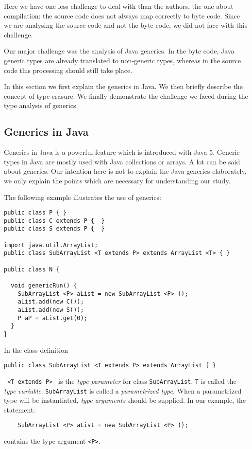 \documentclass{uvamscse}
\begin{document}
Here we have one less challenge to deal with than the authors, the one about compilation: the source code does not always map correctly to byte code. Since we are analysing the source code and not the byte code, we did not face with this challenge. 

Our major challenge was the analysis of Java generics. In the byte code, Java generic types are already translated to non-generic types, whereas in the source code this processing should still take place. 

In this section we first explain the generics in Java. We then briefly describe the concept of type erasure. We finally demonstrate the challenge we faced during the type analysis of generics.

\subsection{Generics in Java} \label{JavaGenerics}
Generics in Java is a powerful feature which is introduced with Java 5. Generic types in Java are mostly used with Java collections or arrays. A lot can be said about generics. Our intention here is not to explain the Java generics elaborately, we only explain the points which are necessary for understanding our study. 

 The following example illustrates the use of generics:
\begin{verbatim}
public class P { }
public class C extends P {  }
public class S extends P {  }

import java.util.ArrayList;
public class SubArrayList <T extends P> extends ArrayList <T> { }

public class N {
  
  void genericRun() {
   	SubArrayList <P> aList = new SubArrayList <P> ();
    aList.add(new C());
    aList.add(new S());
    P aP = aList.get(0);
  }
}
\end{verbatim}

In the class definition
\begin{verbatim}
public class SubArrayList <T extends P> extends ArrayList { }
\end{verbatim}
\texttt{ <T extends P> } is the \emph{type parameter} for class \texttt{SubArrayList}. \texttt{T} is called the \emph{type variable}. \texttt{SubArrayList} is called a \emph{parametrized type}. When a parametrized type will be instantiated, \emph{type arguments} should be supplied. In our example, the statement: 
\begin{verbatim}
   	SubArrayList <P> aList = new SubArrayList <P> ();
\end{verbatim}
contains the type argument \texttt{<P>}.
\end{document}
